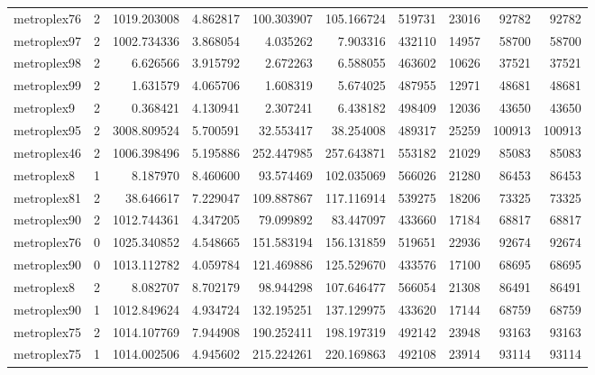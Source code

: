 \begin{longtable}{|l|r|r|r|r|r|r|r|r|r|}
metroplex76 & 2 & 1019.203008 & 4.862817 & 100.303907 & 105.166724 & 519731 & 23016 & 92782 & 92782 \\
metroplex97 & 2 & 1002.734336 & 3.868054 & 4.035262 & 7.903316 & 432110 & 14957 & 58700 & 58700 \\
metroplex98 & 2 & 6.626566 & 3.915792 & 2.672263 & 6.588055 & 463602 & 10626 & 37521 & 37521 \\
metroplex99 & 2 & 1.631579 & 4.065706 & 1.608319 & 5.674025 & 487955 & 12971 & 48681 & 48681 \\
metroplex9 & 2 & 0.368421 & 4.130941 & 2.307241 & 6.438182 & 498409 & 12036 & 43650 & 43650 \\
metroplex95 & 2 & 3008.809524 & 5.700591 & 32.553417 & 38.254008 & 489317 & 25259 & 100913 & 100913 \\
metroplex46 & 2 & 1006.398496 & 5.195886 & 252.447985 & 257.643871 & 553182 & 21029 & 85083 & 85083 \\
metroplex8 & 1 & 8.187970 & 8.460600 & 93.574469 & 102.035069 & 566026 & 21280 & 86453 & 86453 \\
metroplex81 & 2 & 38.646617 & 7.229047 & 109.887867 & 117.116914 & 539275 & 18206 & 73325 & 73325 \\
metroplex90 & 2 & 1012.744361 & 4.347205 & 79.099892 & 83.447097 & 433660 & 17184 & 68817 & 68817 \\
metroplex76 & 0 & 1025.340852 & 4.548665 & 151.583194 & 156.131859 & 519651 & 22936 & 92674 & 92674 \\
metroplex90 & 0 & 1013.112782 & 4.059784 & 121.469886 & 125.529670 & 433576 & 17100 & 68695 & 68695 \\
metroplex8 & 2 & 8.082707 & 8.702179 & 98.944298 & 107.646477 & 566054 & 21308 & 86491 & 86491 \\
metroplex90 & 1 & 1012.849624 & 4.934724 & 132.195251 & 137.129975 & 433620 & 17144 & 68759 & 68759 \\
metroplex75 & 2 & 1014.107769 & 7.944908 & 190.252411 & 198.197319 & 492142 & 23948 & 93163 & 93163 \\
metroplex75 & 1 & 1014.002506 & 4.945602 & 215.224261 & 220.169863 & 492108 & 23914 & 93114 & 93114 \\
\end{longtable}
